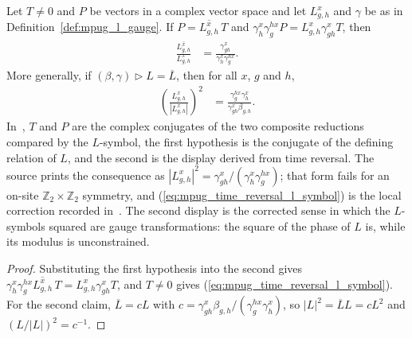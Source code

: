 \begin{lemma}
    \label{thm:mpug_time_reversal_l_symbol_relation}
    \leanok
    Let $T\neq0$ and $P$ be vectors in a complex vector space and let
    $L^x_{g,h}$ and $\gamma$ be as in Definition~\ref{def:mpug_l_gauge}.
    If $P=\overline{L^x_{g,h}}\,T$ and
    $\gamma^x_h\gamma^{h x}_gP=L^x_{g,h}\gamma^x_{gh}T$, then
    \begin{align}
        \frac{\overline{L^x_{g,h}}}{L^x_{g,h}}
         & =\frac{\gamma^x_{gh}}{\gamma^x_h\gamma^{h x}_g}.
        \label{eq:mpug_time_reversal_l_symbol}
    \end{align}
    More generally, if $(\beta,\gamma)\mathbin{\triangleright}L=\overline L$,
    then for all $x$, $g$ and $h$,
    \begin{align}
        \left(\frac{L^x_{g,h}}{|L^x_{g,h}|}\right)^2
         & =\frac{\gamma^{h x}_g\gamma^x_h}{\gamma^x_{gh}\beta_{g,h}}.
    \end{align}
    In~\cite[Section~4.3]{GarreRubio2023MPOSym}, $T$ and $P$ are the
    complex conjugates of the two composite reductions compared by the
    $L$-symbol, the first hypothesis is the conjugate of the defining
    relation of $L$, and the second is the display derived from time
    reversal. The source prints the consequence as
    $|L^x_{g,h}|^2=\gamma^x_{gh}/(\gamma^x_h\gamma^{h x}_g)$; that form fails
    for an on-site $\mathbb Z_2\times\mathbb Z_2$ symmetry, and
    (\ref{eq:mpug_time_reversal_l_symbol}) is the local correction recorded
    in~\cite{gap:glm23_time_reversal_l_symbol}. The second display is the
    corrected sense in which the $L$-symbols squared are gauge
    transformations: the square of the phase of $L$ is, while its modulus is
    unconstrained.
\end{lemma}

\begin{proof}\leanok
    Substituting the first hypothesis into the second gives
    $\gamma^x_h\gamma^{h x}_g\overline{L^x_{g,h}}\,T
        =L^x_{g,h}\gamma^x_{gh}T$, and $T\neq0$ gives
    (\ref{eq:mpug_time_reversal_l_symbol}). For the second claim,
    $\overline L=cL$ with
    $c=\gamma^x_{gh}\beta_{g,h}/(\gamma^{h x}_g\gamma^x_h)$, so
    $|L|^2=\overline LL=cL^2$ and $(L/|L|)^2=c^{-1}$.
\end{proof}

